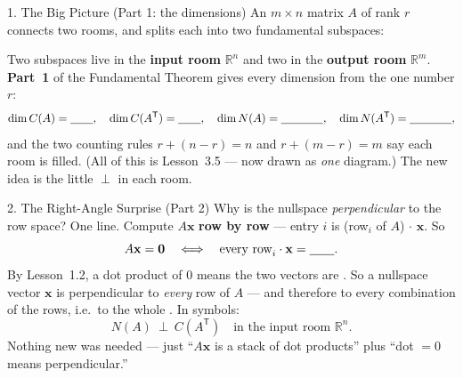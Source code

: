 \documentclass[10pt]{article}
\newcommand{\xx}{\mathbf{x}}
\newcommand{\zero}{\mathbf{0}}
\newcommand{\T}{\mathsf{T}}
\begin{document}
\begin{notesbox}{1. The Big Picture (Part 1: the dimensions)}
An $m\times n$ matrix $A$ of rank $r$ connects two rooms, and splits each into two fundamental subspaces:
\begin{center}
\end{center}
Two subspaces live in the \textbf{input room} $\mathbb{R}^n$ and two in the \textbf{output room}
$\mathbb{R}^m$. \textbf{Part~1} of the Fundamental Theorem gives every dimension from the one number $r$:
\[
  \dim C(A)=\blank{0.7cm},\quad \dim C(A^{\T})=\blank{0.7cm},\quad
  \dim N(A)=\blank{1.3cm},\quad \dim N(A^{\T})=\blank{1.3cm},
\]
and the two counting rules $r+(n-r)=n$ and $r+(m-r)=m$ say each room is filled. (All of this is Lesson~3.5 ---
now drawn as \emph{one} diagram.) The new idea is the little $\perp$ in each room.
\end{notesbox}

\begin{notesbox}{2. The Right-Angle Surprise (Part 2)}
Why is the nullspace \emph{perpendicular} to the row space? One line. Compute $A\xx$ \textbf{row by row} ---
entry $i$ is (row$_i$ of $A$)$\,\cdot\,\xx$. So
\[
  A\xx=\zero \quad\Longleftrightarrow\quad \text{every row}_i\cdot\xx=\blank{0.7cm}.
\]
By Lesson~1.2, a dot product of $0$ means the two vectors are \blank{2.6cm}. So a nullspace vector $\xx$ is
perpendicular to \emph{every} row of $A$ --- and therefore to every combination of the rows, i.e.\ to the
whole \blank{2.2cm}. In symbols:
\[
  N(A)\ \perp\ C(A^{\T}) \quad\text{in the input room }\mathbb{R}^n.
\]
Nothing new was needed --- just ``$A\xx$ is a stack of dot products'' plus ``dot $=0$ means perpendicular.''
\end{notesbox}
\end{document}
